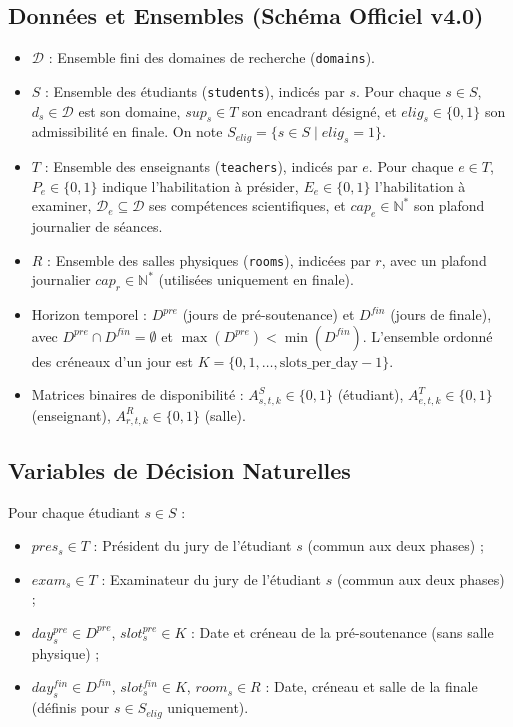 \documentclass[10pt,a4paper]{article}
\begin{document}
\subsection{Données et Ensembles (Schéma Officiel v4.0)}
\begin{itemize}
    \item $\mathcal{D}$ : Ensemble fini des domaines de recherche (\texttt{domains}).
    \item $S$ : Ensemble des étudiants (\texttt{students}), indicés par $s$. Pour chaque $s \in S$, $d_s \in \mathcal{D}$ est son domaine, $sup_s \in T$ son encadrant désigné, et $elig_s \in \{0, 1\}$ son admissibilité en finale. On note $S_{elig} = \{s \in S \mid elig_s = 1\}$.
    \item $T$ : Ensemble des enseignants (\texttt{teachers}), indicés par $e$. Pour chaque $e \in T$, $P_e \in \{0, 1\}$ indique l'habilitation à présider, $E_e \in \{0, 1\}$ l'habilitation à examiner, $\mathcal{D}_e \subseteq \mathcal{D}$ ses compétences scientifiques, et $cap_e \in \mathbb{N}^*$ son plafond journalier de séances.
    \item $R$ : Ensemble des salles physiques (\texttt{rooms}), indicées par $r$, avec un plafond journalier $cap_r \in \mathbb{N}^*$ (utilisées uniquement en finale).
    \item Horizon temporel : $D^{pre}$ (jours de pré-soutenance) et $D^{fin}$ (jours de finale), avec $D^{pre} \cap D^{fin} = \emptyset$ et $\max(D^{pre}) < \min(D^{fin})$. L'ensemble ordonné des créneaux d'un jour est $K = \{0, 1, \dots, \text{slots\_per\_day}-1\}$.
    \item Matrices binaires de disponibilité : $A^S_{s, t, k} \in \{0, 1\}$ (étudiant), $A^T_{e, t, k} \in \{0, 1\}$ (enseignant), $A^R_{r, t, k} \in \{0, 1\}$ (salle).
\end{itemize}

\subsection{Variables de Décision Naturelles}
Pour chaque étudiant $s \in S$ :
\begin{itemize}
    \item $pres_s \in T$ : Président du jury de l'étudiant $s$ (commun aux deux phases) ;
    \item $exam_s \in T$ : Examinateur du jury de l'étudiant $s$ (commun aux deux phases) ;
    \item $day^{pre}_s \in D^{pre}$, $slot^{pre}_s \in K$ : Date et créneau de la pré-soutenance (sans salle physique) ;
    \item $day^{fin}_s \in D^{fin}$, $slot^{fin}_s \in K$, $room_s \in R$ : Date, créneau et salle de la finale (définis pour $s \in S_{elig}$ uniquement).
\end{itemize}
\end{document}
